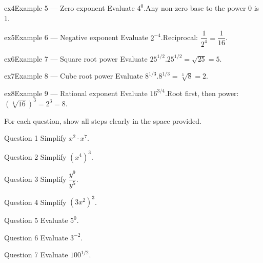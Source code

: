 \documentclass[11pt]{article}
\begin{document}
\begin{example}{ex4}{Example 5 --- Zero exponent}
Evaluate $4^0$.\soln Any non-zero base to the power $0$ is $1$.
\end{example}

\begin{example}{ex5}{Example 6 --- Negative exponent}
Evaluate $2^{-4}$.\soln Reciprocal: $\dfrac{1}{2^4}=\dfrac{1}{16}$.
\end{example}

\begin{example}{ex6}{Example 7 --- Square root power}
Evaluate $25^{1/2}$.\soln $25^{1/2}=\sqrt{25}=5$.
\end{example}

\begin{example}{ex7}{Example 8 --- Cube root power}
Evaluate $8^{1/3}$.\soln $8^{1/3}=\sqrt[3]{8}=2$.
\end{example}

\begin{example}{ex8}{Example 9 --- Rational exponent}
Evaluate $16^{3/4}$.\soln Root first, then power: $(\sqrt[4]{16})^3=2^3=8$.
\end{example}

\clearpage
{}
For each question, show all steps clearly in the space provided.

\begin{qbox}{Question 1}
Simplify $x^2\cdot x^7$.\workspace{2.4cm}
\end{qbox}

\begin{qbox}{Question 2}
Simplify $(x^4)^3$.\workspace{2.4cm}
\end{qbox}

\begin{qbox}{Question 3}
Simplify $\dfrac{y^9}{y^5}$.\workspace{2.4cm}
\end{qbox}

\begin{qbox}{Question 4}
Simplify $(3x^2)^3$.\workspace{2.4cm}
\end{qbox}

\begin{qbox}{Question 5}
Evaluate $5^0$.\workspace{2.4cm}
\end{qbox}

\begin{qbox}{Question 6}
Evaluate $3^{-2}$.\workspace{2.4cm}
\end{qbox}

\begin{qbox}{Question 7}
Evaluate $100^{1/2}$.\workspace{2.4cm}
\end{qbox}
\end{document}
